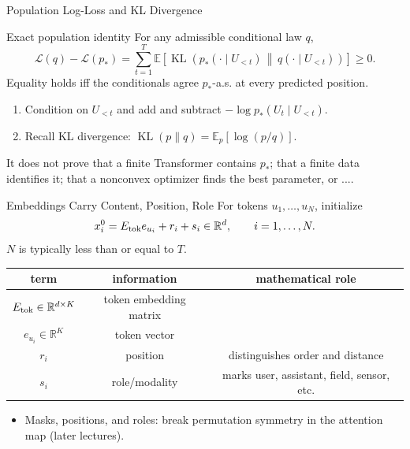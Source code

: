 \documentclass[aspectratio=169,11pt]{beamer}
\newcommand{\R}{\mathbb{R}}
\newcommand{\E}{\mathbb{E}}
\DeclareMathOperator{\KL}{KL}
\begin{document}
\begin{frame}{Population Log-Loss and KL Divergence}
\begin{block}{Exact population identity}
For any admissible conditional law $q$,
\[
 \mathcal L(q)-\mathcal L(p_*)
 =\sum_{t=1}^T\E\!\left[
  \KL\!\left(p_*(\cdot\mid U_{<t})\,\middle\|\,
             q(\cdot\mid U_{<t})\right)
 \right]\ge 0.
\]
Equality holds iff the conditionals agree $p_*$-a.s. at every predicted position.
\end{block}
\begin{enumerate}
\item Condition on $U_{<t}$ and add and subtract
$-\log p_*(U_t\mid U_{<t})$.
\item Recall KL divergence: $\KL(p\|q)=\E_p[\log(p/q)]$.
\end{enumerate}


\begin{alertblock}{It does not prove}
that a finite Transformer contains $p_*$; that a finite data identifies it;
that a nonconvex optimizer finds the best parameter, or ....
\end{alertblock}
\end{frame}

\begin{frame}{Embeddings Carry Content, Position, Role}
For tokens $u_1,\ldots,u_N$, initialize
\[
 x_i^0=E_{\rm tok}e_{u_i}+r_i+s_i\in\R^d,
 \qquad i=1,\ldots,N.
\]
$N$ is typically less than or equal to $T$.  
\begin{center}
\begin{tabular}{c|c|c}
term & information & mathematical role \\
\hline
$E_{\rm tok}\in \R^{d\times K}$ & token embedding matrix &  \\
$e_{u_i}\in \R^K$ & token vector &  \\
$r_i$ & position & distinguishes order and distance \\
$s_i$ & role/modality & marks user, assistant, field, sensor, etc.
\end{tabular}
\end{center}

\begin{itemize}
  \item Masks, positions, and roles: break permutation symmetry in the attention map (later lectures). 

  
\end{itemize}

\end{frame}
\end{document}
